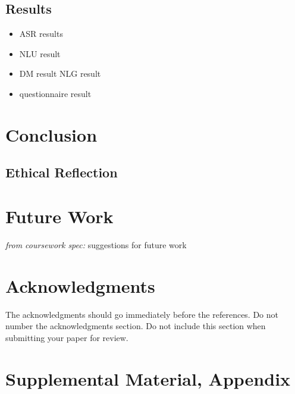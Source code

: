 \documentclass[hidelinks, 11pt]{article}
\begin{document}
\subsection{Results}
\label{subsec:results}

\begin{itemize}
  \item ASR results
  \item NLU result
  \item DM result
        NLG result
  \item questionnaire result
\end{itemize}

\section{Conclusion}
\label{sec:conclusion}

\subsection{Ethical Reflection}
\label{subsec:ethics}

\section{Future Work}
\label{sec:future_work}

\textit{from coursework spec:} suggestions for future work



\section*{Acknowledgments}
\label{sec:acknowledgments}

The acknowledgments should go immediately before the references.  Do
not number the acknowledgments section. Do not include this section
when submitting your paper for review.

%
%



\appendix

\section{Supplemental Material, Appendix}
\label{sec:supplemental}
\end{document}

